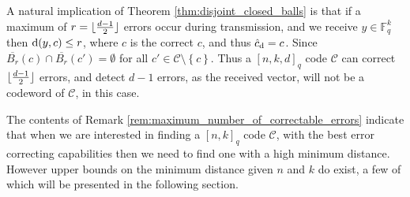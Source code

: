 \begin{remark}\label{rem:maximum_number_of_correctable_errors}
A natural implication of Theorem \ref{thm:disjoint_closed_balls} is that if a maximum of $r = \lfloor\frac{d-1}{2}\rfloor$ errors occur during transmission, and we receive $y \in \mathbb{F}^k_q$ then $\mathrm{d}(y, c) \leq r$, where $c$ is the correct $c$, and thus $\hat{c}_{\mathrm{d}} = c$. Since $\overline{B_{r}}(c) \cap \overline{B_r}(c') = \emptyset$ for all $c' \in \mathcal{C} \setminus \left\{c\right\}$. Thus a $[n, k, d]_{q}$ code $\mathcal{C}$ can correct $\lfloor\frac{d - 1}{2}\rfloor$ errors, and detect $d-1$ errors, as the received vector, will not be a codeword of $\mathcal{C}$, in this case.
\end{remark}

The contents of Remark \ref{rem:maximum_number_of_correctable_errors} indicate that when we are interested in finding a $[n, k]_{q}$ code $\mathcal{C}$, with the best error correcting capabilities then we need to find one with a high minimum distance.
However upper bounds on the minimum distance given $n$ and $k$ do exist, a few of which will be presented in the following section.
